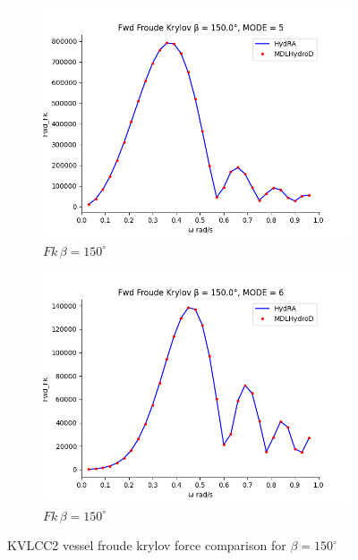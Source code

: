\begin{figure}[H]
\begin{subfigure}[b]{0.45\textwidth}
        \includegraphics[width=\textwidth]{plots/kvlcc/fk/fk5.png}
        \caption{$Fk \, \beta = 150^{\circ}$}
    \end{subfigure}
    \begin{subfigure}[b]{0.45\textwidth}
        \includegraphics[width=\textwidth]{plots/kvlcc/fk/fk6.png}
        \caption{$Fk \, \beta = 150^{\circ}$}
    \end{subfigure}
    \caption{KVLCC2 vessel froude krylov force comparison for $\beta= 150^{\circ}$}
    \label{fig:kvlcc_froude_krylov}
\end{figure}

